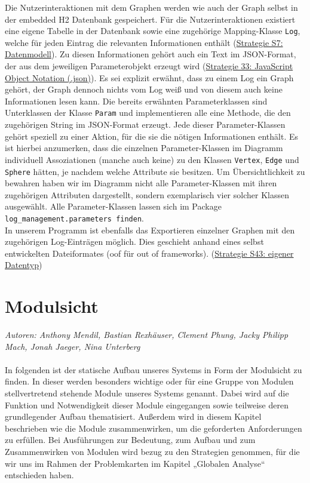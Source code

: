 \documentclass[enabledeprecatedfontcommands,fontsize=11pt,paper=a4,twoside]{scrartcl}
\newcounter{one}
\begin{document}
Die Nutzerinteraktionen mit dem Graphen werden wie auch der Graph selbst in der embedded H2 Datenbank gespeichert. Für die Nutzerinteraktionen existiert eine eigene Tabelle in der Datenbank sowie eine zugehörige Mapping-Klasse \texttt{Log}, welche für jeden Eintrag die relevanten Informationen enthält (\hyperlink{aaa}{Strategie S7: Datenmodell}). Zu diesen Informationen gehört auch ein Text im JSON-Format, der aus dem jeweiligen Parameterobjekt erzeugt wird (\hyperlink{jjj}{Strategie 33: JavaScript Object Notation (.json)}). Es sei explizit erwähnt, dass zu einem Log ein Graph gehört, der Graph dennoch nichts vom Log weiß und von diesem auch keine Informationen lesen kann. Die bereits erwähnten Parameterklassen sind Unterklassen der Klasse \texttt{Param} und implementieren alle eine Methode, die den zugehörigen String im JSON-Format erzeugt. Jede dieser Parameter-Klassen gehört speziell zu einer Aktion, für die sie die nötigen Informationen enthält. Es ist hierbei anzumerken, dass die einzelnen Parameter-Klassen im Diagramm individuell Assoziationen  (manche auch keine) zu den Klassen \texttt{Vertex}, \texttt{Edge} und \texttt{Sphere} hätten, je nachdem welche Attribute sie besitzen. Um Übersichtlichkeit zu bewahren haben wir im Diagramm nicht alle Parameter-Klassen mit ihren zugehörigen Attributen dargestellt, sondern exemplarisch vier solcher Klassen ausgewählt. Alle Parameter-Klassen lassen sich im Package \texttt{log\_management.parameters finden}. \\

In unserem Programm ist ebenfalls das Exportieren einzelner Graphen mit den zugehörigen Log-Einträgen möglich. Dies geschieht anhand eines selbst entwickelten Dateiformates (oof für \glqq out of frameworks\grqq). (\hyperlink{Strategie S43: eigener Datentyp}{Strategie S43: eigener Datentyp})


\newpage
\section{Modulsicht}
\emph{Autoren: Anthony Mendil, Bastian Rexhäuser, Clement Phung, Jacky Philipp Mach, Jonah Jaeger, Nina Unterberg}\\\\

In folgenden ist der statische Aufbau unseres Systems in Form der Modulsicht zu finden. In dieser werden besonders wichtige oder für eine Gruppe von Modulen stellvertretend stehende Module unseres Systems genannt. Dabei wird auf die Funktion und Notwendigkeit dieser Module eingegangen sowie teilweise deren grundlegender Aufbau thematisiert. Außerdem wird in diesem Kapitel beschrieben wie die Module zusammenwirken, um die geforderten Anforderungen zu erfüllen. Bei Ausführungen zur Bedeutung, zum Aufbau und zum Zusammenwirken von Modulen wird bezug zu den Strategien genommen, für die wir uns im Rahmen der Problemkarten im Kapitel „Globalen Analyse“ entschieden haben. \\ \\
\end{document}
